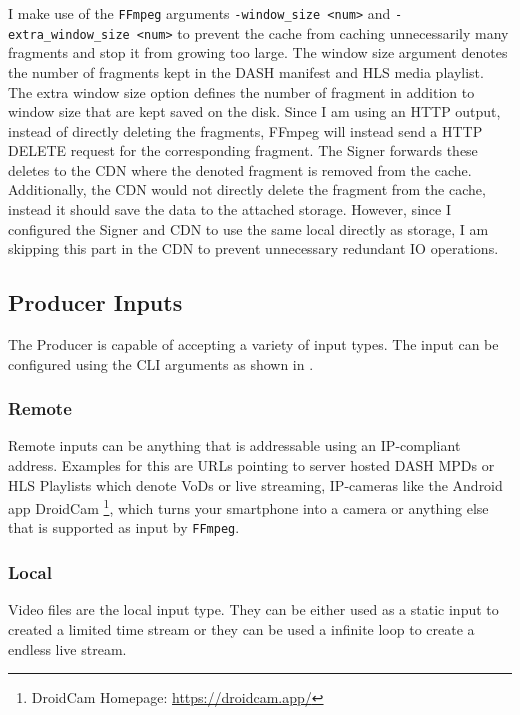 I make use of the \texttt{FFmpeg} arguments \texttt{-window\_size <num>} and \texttt{-extra\_window\_size <num>} to prevent the cache from caching unnecessarily many fragments and stop it from growing too large. The window size argument denotes the number of fragments kept in the DASH manifest and HLS media playlist. The extra window size option defines the number of fragment in addition to window size that are kept saved on the disk. Since I am using an HTTP output, instead of directly deleting the fragments, FFmpeg will instead send a HTTP DELETE request for the corresponding fragment. The Signer forwards these deletes to the CDN where the denoted fragment is removed from the cache. Additionally, the CDN would not directly delete the fragment from the cache, instead it should save the data to the attached storage. However, since I configured the Signer and CDN to use the same local directly as storage, I am skipping this part in the CDN to prevent unnecessary redundant IO operations.

\subsection{Producer Inputs\label{sec:producer_inputs}}

The Producer is capable of accepting a variety of input types. The input can be configured using the CLI arguments as shown in .

\subsubsection{Remote}

Remote inputs can be anything that is addressable using an IP-compliant address. Examples for this are URLs pointing to server hosted DASH MPDs or HLS Playlists which denote VoDs or live streaming, IP-cameras like the Android app DroidCam \footnote{DroidCam Homepage: \url{https://droidcam.app/}}, which turns your smartphone into a camera or anything else that is supported as input by \texttt{FFmpeg}.

\subsubsection{Local}

Video files are the local input type. They can be either used as a static input to created a limited time stream or they can be used a infinite loop to create a endless live stream.

